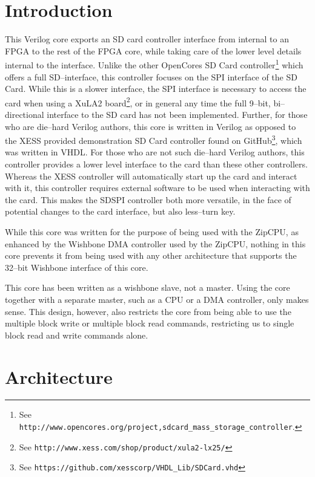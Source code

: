 \documentclass{gqtekspec}
\begin{document}
\chapter{Introduction}
\setcounter{page}{1}

This Verilog core exports an SD card controller interface from internal to an
FPGA to the rest of the FPGA core, while taking care of the lower level details
internal to the interface.
Unlike the other OpenCores SD Card controller\footnote{See
\texttt{http://www.opencores.org/project,sdcard\_mass\_storage\_controller}.}
which offers a full SD--interface, this controller focuses on the SPI interface
of the SD Card.  While this is a slower interface, the SPI interface is
necessary to access the card when using a XuLA2
board\footnote{See \texttt{http://www.xess.com/shop/product/xula2-lx25/}}, or
in general any time the full 9--bit, bi--directional interface to the SD card
has not been implemented.
Further, for those who are die--hard Verilog authors, this core is written in
Verilog as opposed to the XESS provided demonstration SD Card controller
found on GitHub\footnote{See
\texttt{https://github.com/xesscorp/VHDL\_Lib/SDCard.vhd}}, which was written
in VHDL.  For those who are not such die--hard Verilog authors, this controller
provides a lower level interface to the card than these other controllers. 
Whereas the XESS controller will automatically start up the card and interact
with it, this controller requires external software to be used when interacting
with the card.  This makes the SDSPI controller both more versatile, in the
face of potential changes to the card interface, but also less--turn key.

While this core was written for the purpose of being used with the ZipCPU,
as enhanced by the Wishbone DMA controller used by the ZipCPU, nothing in this
core prevents it from being used with any other architecture that supports
the 32--bit Wishbone interface of this core.

This core has been written as a wishbone slave, not a master.  Using the core
together with a separate master, such as a CPU or a DMA controller, only makes
sense.  This design, however, also restricts the core from being able to use
the multiple block write or multiple block read commands, restricting us to 
single block read and write commands alone.

\chapter{Architecture}\label{ch:arch}
\end{document}
